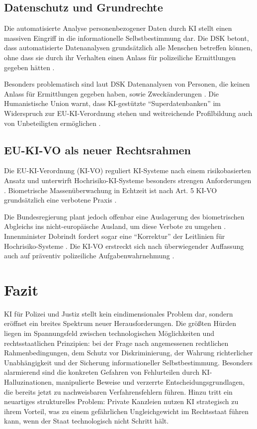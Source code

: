 \documentclass[12pt,a4paper]{article}
\begin{document}
	\subsection{Datenschutz und Grundrechte}
	
	Die automatisierte Analyse personenbezogener Daten durch KI stellt einen massiven Eingriff in die informationelle Selbstbestimmung dar. Die DSK betont, dass automatisierte Datenanalysen grundsätzlich alle Menschen betreffen können, ohne dass sie durch ihr Verhalten einen Anlass für polizeiliche Ermittlungen gegeben hätten \cite{DSK2025}.
	
	Besonders problematisch sind laut DSK Datenanalysen von Personen, die keinen Anlass für Ermittlungen gegeben haben, sowie Zweckänderungen \cite{Datenschutzticker2025}. Die Humanistische Union warnt, dass KI-gestützte \enquote{Superdatenbanken} im Widerspruch zur EU-KI-Verordnung stehen und weitreichende Profilbildung auch von Unbeteiligten ermöglichen \cite{HumanUnion2025}.
	
	\subsection{EU-KI-VO als neuer Rechtsrahmen}
	
	Die EU-KI-Verordnung (KI-VO) reguliert KI-Systeme nach einem risikobasierten Ansatz und unterwirft Hochrisiko-KI-Systeme besonders strengen Anforderungen \cite{Kriminalpolizei2026}. Biometrische Massenüberwachung in Echtzeit ist nach Art. 5 KI-VO grundsätzlich eine verbotene Praxis \cite{RAV2025}.
	
	Die Bundesregierung plant jedoch offenbar eine Auslagerung des biometrischen Abgleichs ins nicht-europäische Ausland, um diese Verbote zu umgehen \cite{Gruene2026}. Innenminister Dobrindt fordert sogar eine \enquote{Korrektur} der Leitlinien für Hochrisiko-Systeme \cite{Dobrindt2026}. Die KI-VO erstreckt sich nach überwiegender Auffassung auch auf präventiv polizeiliche Aufgabenwahrnehmung \cite{Kriminalpolizei2026}.
	
	\section{Fazit}
	
	KI für Polizei und Justiz stellt kein eindimensionales Problem dar, sondern eröffnet ein breites Spektrum neuer Herausforderungen. Die größten Hürden liegen im Spannungsfeld zwischen technologischen Möglichkeiten und rechtsstaatlichen Prinzipien: bei der Frage nach angemessenen rechtlichen Rahmenbedingungen, dem Schutz vor Diskriminierung, der Wahrung richterlicher Unabhängigkeit und der Sicherung informationeller Selbstbestimmung. Besonders alarmierend sind die konkreten Gefahren von Fehlurteilen durch KI-Halluzinationen, manipulierte Beweise und verzerrte Entscheidungsgrundlagen, die bereits jetzt zu nachweisbaren Verfahrensfehlern führen. Hinzu tritt ein neuartiges strukturelles Problem: Private Kanzleien nutzen KI strategisch zu ihrem Vorteil, was zu einem gefährlichen Ungleichgewicht im Rechtsstaat führen kann, wenn der Staat technologisch nicht Schritt hält.
	
\end{document}
